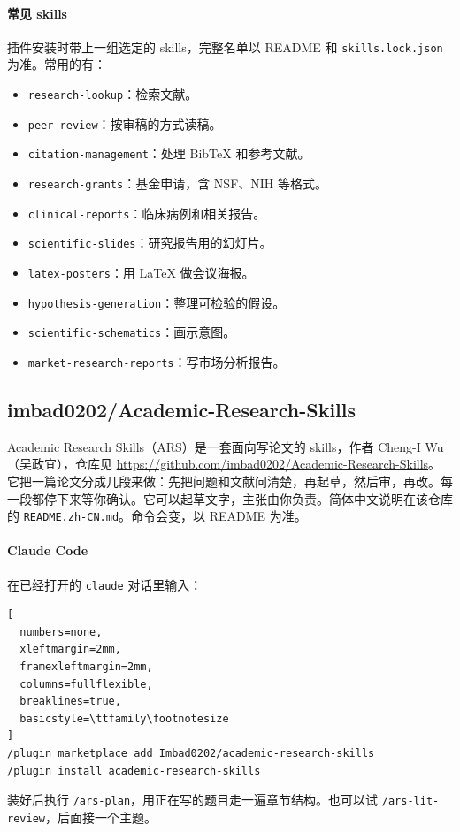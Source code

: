 \paragraph{常见 skills}
插件安装时带上一组选定的 skills，完整名单以 README 和 \verb|skills.lock.json| 为准。常用的有：
\begin{itemize}
\item \verb|research-lookup|：检索文献。
\item \verb|peer-review|：按审稿的方式读稿。
\item \verb|citation-management|：处理 BibTeX 和参考文献。
\item \verb|research-grants|：基金申请，含 NSF、NIH 等格式。
\item \verb|clinical-reports|：临床病例和相关报告。
\item \verb|scientific-slides|：研究报告用的幻灯片。
\item \verb|latex-posters|：用 LaTeX 做会议海报。
\item \verb|hypothesis-generation|：整理可检验的假设。
\item \verb|scientific-schematics|：画示意图。
\item \verb|market-research-reports|：写市场分析报告。
\end{itemize}




\subsection{imbad0202/Academic-Research-Skills}
Academic Research Skills（ARS）是一套面向写论文的 skills，作者 Cheng-I Wu（吴政宜），仓库见 \url{https://github.com/imbad0202/Academic-Research-Skills}。它把一篇论文分成几段来做：先把问题和文献问清楚，再起草，然后审，再改。每一段都停下来等你确认。它可以起草文字，主张由你负责。简体中文说明在该仓库的 \verb|README.zh-CN.md|。命令会变，以 README 为准。

\paragraph{Claude Code}
在已经打开的 \verb|claude| 对话里输入：
\begin{lstlisting}[
  numbers=none,
  xleftmargin=2mm,
  framexleftmargin=2mm,
  columns=fullflexible,
  breaklines=true,
  basicstyle=\ttfamily\footnotesize
]
/plugin marketplace add Imbad0202/academic-research-skills
/plugin install academic-research-skills
\end{lstlisting}
装好后执行 \verb|/ars-plan|，用正在写的题目走一遍章节结构。也可以试 \verb|/ars-lit-review|，后面接一个主题。

